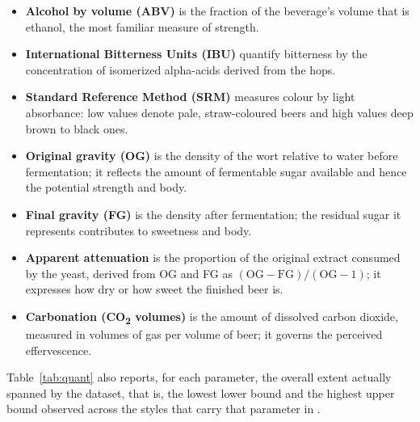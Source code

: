 \begin{itemize}[leftmargin=2em]
  \item \textbf{Alcohol by volume (ABV)} is the fraction of the beverage's volume
        that is ethanol, the most familiar measure of strength.
  \item \textbf{International Bitterness Units (IBU)} quantify bitterness by the
        concentration of isomerized alpha-acids derived from the hops.
  \item \textbf{Standard Reference Method (SRM)} measures colour by light
        absorbance: low values denote pale, straw-coloured beers and high values
        deep brown to black ones.
  \item \textbf{Original gravity (OG)} is the density of the wort relative to
        water before fermentation; it reflects the amount of fermentable sugar
        available and hence the potential strength and body.
  \item \textbf{Final gravity (FG)} is the density after fermentation; the
        residual sugar it represents contributes to sweetness and body.
  \item \textbf{Apparent attenuation} is the proportion of the original extract
        consumed by the yeast, derived from OG and FG as
        $(\mathrm{OG}-\mathrm{FG})/(\mathrm{OG}-1)$; it expresses how dry or how
        sweet the finished beer is.
  \item \textbf{Carbonation (CO\textsubscript{2} volumes)} is the amount of
        dissolved carbon dioxide, measured in volumes of gas per volume of beer;
        it governs the perceived effervescence.
\end{itemize}

Table~\ref{tab:quant} also reports, for each parameter, the overall extent
actually spanned by the dataset, that is, the lowest lower bound and the highest
upper bound observed across the styles that carry that parameter in
.

